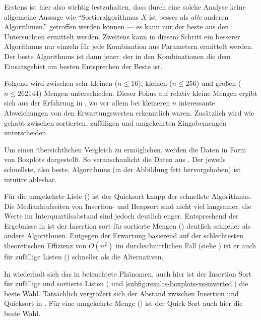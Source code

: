 Erstens ist hier also wichtig festzuhalten, dass durch eine solche Analyse keine allgemeine Aussage wie \enquote{Sortieralgorithmus $X$ ist besser als \emph{alle} anderen Algorithmen.} getroffen werden können --- es kann nur der beste aus den Untersuchten ermittelt werden. Zweitens kann in diesem Schritt ein besserer Algorithmus nur einzeln für jede Kombination aus Parametern ermittelt werden. Der beste Algorithmus ist dann jener, der in den Kombinationen die dem Einsatzgebiet am besten Entsprechen der Beste ist.

Folgend wird zwischen sehr kleinen ($n \leq 16$), kleinen ($n \leq 256$) und großen ($n \leq 262144$) Mengen unterschieden. Dieser Fokus auf relativ kleine Mengen ergibt sich aus der Erfahrung in , wo vor allem bei kleineren $n$ interessante Abweichungen von den Erwartungswerten erkenntlich waren. Zusätzlich wird wie gehabt zwischen sortierten, zufälligen und umgekehrten Eingabemengen unterscheiden.



Um einen übersichtlichen Vergleich zu ermöglichen, werden die Daten in Form von Boxplots dargestellt.  So veranschaulicht  die Daten aus . Der jeweils schnellste, also beste, Algorithmus (in der Abbildung fett hervorgehoben) ist intuitiv ablesbar.

Für die umgekehrte Liste () ist der Quicksort knapp der schnellste Algorithmus. Die Medianlaufzeiten von Insertion- und Heapsort sind nicht viel langsamer, die Werte im Interquartilsabstand sind jedoch deutlich enger. Entsprechend der Ergebnisse in  ist der Insertion sort für sortierte Mengen () deutlich schneller als andere Algorithmen. Entgegen der Erwartung basierend auf der schlechtesten theoretischen Effizienz von $O(n^2)$ im durchschnittlichen Fall (siehe ) ist er auch für zufällige Listen () schneller als die Alternativen.



In  wiederholt sich das in  betrachtete Phänomen, auch hier ist der Insertion Sort für zufällige und sortierte Listen ( und \ref{subfig:results-boxplots-xs-inverted}) die beste Wahl. Tatsächlich vergrößert sich der Abstand zwischen Insertion und Quicksort in . Für eine umgekehrte Menge () ist der Quick Sort auch hier die beste Wahl.

